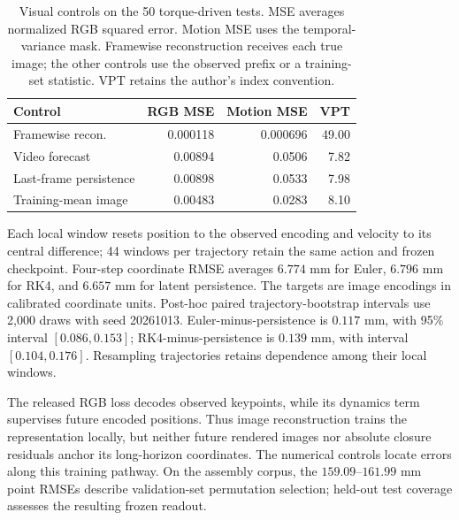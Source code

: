 \begin{table}[t]
\caption{Visual controls on the 50 torque-driven tests. MSE averages normalized RGB squared error. Motion MSE uses the temporal-variance mask. Framewise reconstruction receives each true image; the other controls use the observed prefix or a training-set statistic. VPT retains the author's index convention.}
\label{app:visual-controls}
\centering\small
\begin{tabular}{lrrr}
\toprule
Control & RGB MSE & Motion MSE & VPT\\
\midrule
Framewise recon. & 0.000118 & 0.000696 & 49.00 \\
Video forecast & 0.00894 & 0.0506 & 7.82 \\
Last-frame persistence & 0.00898 & 0.0533 & 7.98 \\
Training-mean image & 0.00483 & 0.0283 & 8.10 \\
\bottomrule
\end{tabular}
\end{table}

Each local window resets position to the observed encoding and velocity to its central difference; 44 windows per trajectory retain the same action and frozen checkpoint. Four-step coordinate RMSE averages $6.774$ mm for Euler, $6.796$ mm for RK4, and $6.657$ mm for latent persistence. The targets are image encodings in calibrated coordinate units. Post-hoc paired trajectory-bootstrap intervals use 2,000 draws with seed 20261013. Euler-minus-persistence is $0.117$ mm, with 95\% interval $[0.086,0.153]$; RK4-minus-persistence is $0.139$ mm, with interval $[0.104,0.176]$. Resampling trajectories retains dependence among their local windows.

The released RGB loss decodes observed keypoints, while its dynamics term supervises future encoded positions. Thus image reconstruction trains the representation locally, but neither future rendered images nor absolute closure residuals anchor its long-horizon coordinates. The numerical controls locate errors along this training pathway. On the assembly corpus, the $159.09$--$161.99$ mm point RMSEs describe validation-set permutation selection; held-out test coverage assesses the resulting frozen readout.

